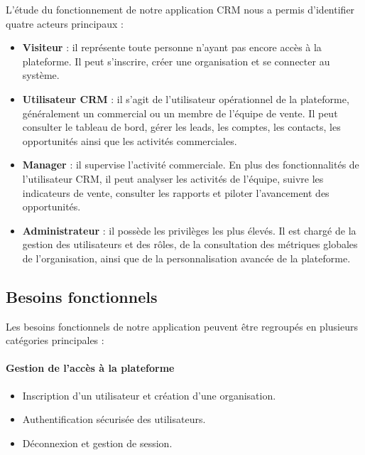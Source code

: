 \documentclass[12pt,a4paper]{report}
\begin{document}
L’étude du fonctionnement de notre application CRM nous a permis d’identifier quatre acteurs principaux :

\begin{itemize}
    \item \textbf{Visiteur} : il représente toute personne n’ayant pas encore accès à la plateforme. Il peut s’inscrire, créer une organisation et se connecter au système.
    
    \item \textbf{Utilisateur CRM} : il s’agit de l’utilisateur opérationnel de la plateforme, généralement un commercial ou un membre de l’équipe de vente. Il peut consulter le tableau de bord, gérer les leads, les comptes, les contacts, les opportunités ainsi que les activités commerciales.
    
    \item \textbf{Manager} : il supervise l’activité commerciale. En plus des fonctionnalités de l’utilisateur CRM, il peut analyser les activités de l’équipe, suivre les indicateurs de vente, consulter les rapports et piloter l’avancement des opportunités.
    
    \item \textbf{Administrateur} : il possède les privilèges les plus élevés. Il est chargé de la gestion des utilisateurs et des rôles, de la consultation des métriques globales de l’organisation, ainsi que de la personnalisation avancée de la plateforme.
\end{itemize}

\subsection{Besoins fonctionnels}

Les besoins fonctionnels de notre application peuvent être regroupés en plusieurs catégories principales :

\paragraph{Gestion de l’accès à la plateforme}
\begin{itemize}
    \item Inscription d’un utilisateur et création d’une organisation.
    \item Authentification sécurisée des utilisateurs.
    \item Déconnexion et gestion de session.
\end{itemize}
\end{document}
